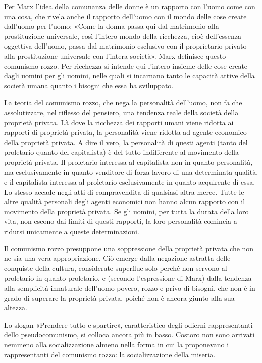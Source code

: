 \documentclass[../main]{subfiles}
\begin{document}
Per Marx l'idea della comunanza delle donne è un rapporto con l'uomo come con una cosa, che rivela anche il rapporto dell'uomo con il mondo delle cose create dall'uomo per l'uomo: «Come la donna passa qui dal matrimonio alla prostituzione universale, così l'intero mondo della ricchezza, cioè dell'essenza oggettiva dell'uomo, passa dal matrimonio esclusivo con il proprietario privato alla prostituzione universale con l'intera società». Marx definisce questo comunismo rozzo. Per ricchezza si intende qui l'intero insieme delle cose create dagli uomini per gli uomini, nelle quali si incarnano tanto le capacità attive della società umana quanto i bisogni che essa ha sviluppato.

La teoria del comunismo rozzo, che nega la personalità dell'uomo, non fa che assolutizzare, nel riflesso del pensiero, una tendenza reale della società della proprietà privata. Là dove la ricchezza dei rapporti umani viene ridotta ai rapporti di proprietà privata, la personalità viene ridotta ad agente economico della proprietà privata. A dire il vero, la personalità di questi agenti (tanto del proletario quanto del capitalista) è del tutto indifferente al movimento della proprietà privata. Il proletario interessa al capitalista non in quanto personalità, ma esclusivamente in quanto venditore di forza-lavoro di una determinata qualità, e il capitalista interessa al proletario esclusivamente in quanto acquirente di essa. Lo stesso accade negli atti di compravendita di qualsiasi altra merce. Tutte le altre qualità personali degli agenti economici non hanno alcun rapporto con il movimento della proprietà privata. Se gli uomini, per tutta la durata della loro vita, non escono dai limiti di questi rapporti, la loro personalità comincia a ridursi unicamente a queste determinazioni.

Il comunismo rozzo presuppone una soppressione della proprietà privata che non ne sia una vera appropriazione. Ciò emerge dalla negazione astratta delle conquiste della cultura, considerate superflue solo perché non servono al proletario in quanto proletario, e (secondo l'espressione di Marx) dalla tendenza alla semplicità innaturale dell'uomo povero, rozzo e privo di bisogni, che non è in grado di superare la proprietà privata, poiché non è ancora giunto alla sua altezza.

Lo slogan «Prendere tutto e spartire», caratteristico degli odierni rappresentanti dello pseudocomunismo, si colloca ancora più in basso. Costoro non sono arrivati nemmeno alla socializzazione almeno nella forma in cui la proponevano i rappresentanti del comunismo rozzo: la socializzazione della miseria.
\end{document}
